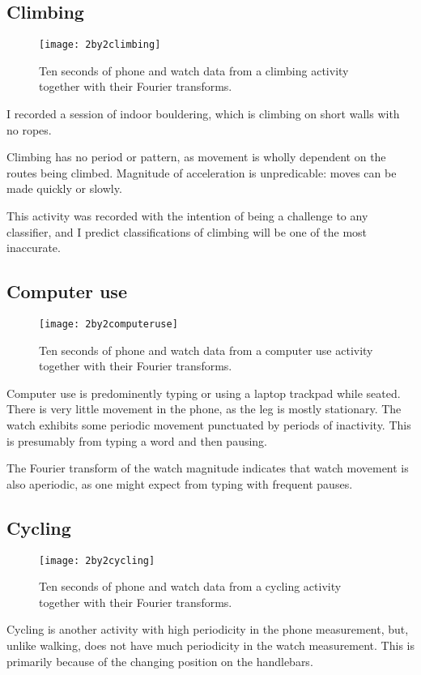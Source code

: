     \subsection{Climbing}
      \begin{figure}[!th]
        \centering
        \texttt{[image: 2by2climbing]}
        \caption{Ten seconds of phone and watch data from a climbing activity together with their Fourier transforms.}
        \label{fig:2by2computeruse}
      \end{figure}
      
      I recorded a session of indoor bouldering, which is climbing on short walls with no ropes.
      
      Climbing has no period or pattern, as movement is wholly dependent on the routes being climbed. Magnitude of acceleration is unpredicable: moves can be made quickly or slowly.
      
      This activity was recorded with the intention of being a challenge to any classifier, and I predict classifications of climbing will be one of the most inaccurate.
    \subsection{Computer use}
      \begin{figure}[!th]
        \centering
        \texttt{[image: 2by2computeruse]}
        \caption{Ten seconds of phone and watch data from a computer use activity together with their Fourier transforms.}
        \label{fig:2by2computeruse}
      \end{figure}
      
      Computer use is predominently typing or using a laptop trackpad while seated. There is very little movement in the phone, as the leg is mostly   stationary. The watch exhibits some periodic movement punctuated by periods of inactivity. This is presumably from typing a word and then pausing.
      
      The Fourier transform of the watch magnitude indicates that watch movement is also aperiodic, as one might expect from typing with frequent pauses. 
    \subsection{Cycling}
      \begin{figure}[!th]
        \centering
        \texttt{[image: 2by2cycling]}
        \caption{Ten seconds of phone and watch data from a cycling activity together with their Fourier transforms.}
        \label{fig:2by2cycling}
      \end{figure}
      Cycling is another activity with high periodicity in the phone measurement, but, unlike walking, does not have much periodicity in the watch measurement. This is primarily because of the changing position on the handlebars.
